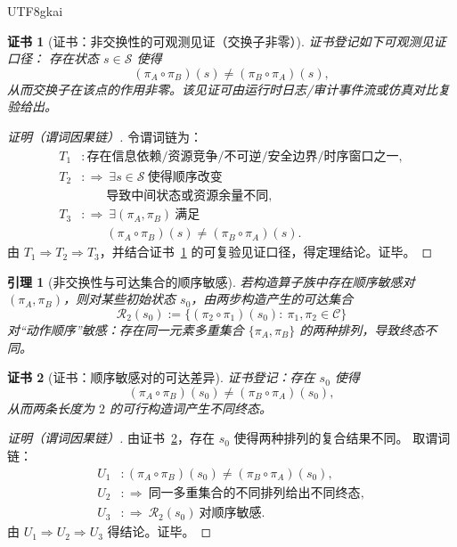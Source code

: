 \documentclass[12pt]{article}
\newtheorem{lemma}{引理}[section]
\newtheorem{Certificate}{证书}[section]
\begin{document}
\begin{CJK*}{UTF8}{gkai}
\begin{Certificate}[证书：非交换性的可观测见证（交换子非零）]
\label{cert:noncommutativity-witness}
证书登记如下可观测见证口径：
存在状态 $s\in\mathcal{S}$ 使得
\[
  (\pi_A\circ \pi_B)(s)\neq (\pi_B\circ \pi_A)(s),
\]
从而交换子在该点的作用非零。该见证可由运行时日志/审计事件流或仿真对比复验给出。
\end{Certificate}

\begin{proof}[证明（谓词因果链）]
令谓词链为：
\[
\begin{aligned}
  T_1 &: \text{存在信息依赖/资源竞争/不可逆/安全边界/时序窗口之一},\\
  T_2 &: \Rightarrow\ \exists s\in\mathcal{S}\ \text{使得顺序改变}\\
      &\qquad \text{导致中间状态或资源余量不同},\\
  T_3 &: \Rightarrow\ \exists(\pi_A,\pi_B)\ \text{满足}\\
      &\qquad (\pi_A\circ \pi_B)(s)\neq(\pi_B\circ \pi_A)(s).
\end{aligned}
\]
由 $T_1\Rightarrow T_2\Rightarrow T_3$，并结合证书~\ref{cert:noncommutativity-witness} 的可复验见证口径，得定理结论。证毕。
\end{proof}

\begin{lemma}[非交换性与可达集合的顺序敏感]
\label{lem:reachable-set-order-sensitive}
若构造算子族中存在顺序敏感对 $(\pi_A,\pi_B)$，则对某些初始状态 $s_0$，由两步构造产生的可达集合
\[
  \mathcal{R}_2(s_0)
  :=
  \{(\pi_2\circ\pi_1)(s_0):\ \pi_1,\pi_2\in\mathcal{C}\}
\]
对“动作顺序”敏感：存在同一元素多重集合 $\{\pi_A,\pi_B\}$ 的两种排列，导致终态不同。
\end{lemma}

\begin{Certificate}[证书：顺序敏感对的可达差异]
\label{cert:reachable-set-order-sensitive}
证书登记：存在 $s_0$ 使得
\[
  (\pi_A\circ\pi_B)(s_0)\neq (\pi_B\circ\pi_A)(s_0),
\]
从而两条长度为 $2$ 的可行构造词产生不同终态。
\end{Certificate}

\begin{proof}[证明（谓词因果链）]
由证书~\ref{cert:reachable-set-order-sensitive}，存在 $s_0$ 使得两种排列的复合结果不同。
取谓词链：
\[
\begin{aligned}
  U_1 &: (\pi_A\circ\pi_B)(s_0)\neq (\pi_B\circ\pi_A)(s_0),\\
  U_2 &: \Rightarrow\ \text{同一多重集合的不同排列给出不同终态},\\
  U_3 &: \Rightarrow\ \mathcal{R}_2(s_0)\ \text{对顺序敏感}.
\end{aligned}
\]
由 $U_1\Rightarrow U_2\Rightarrow U_3$ 得结论。证毕。
\end{proof}


\end{CJK*}
\end{document}
